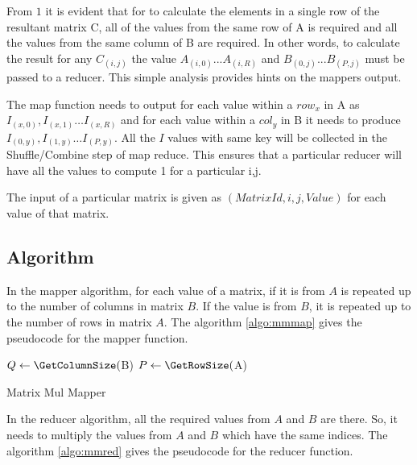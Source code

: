 \documentclass{article}
\begin{document}
From \(1\) it is evident that for to calculate the elements in a single row of the resultant matrix C, all of the values from the same row of A is required and all the values from the same column of B are required. In other words, to calculate the result for any ${C_{(i,j)}}$ the value ${A_{(i,0)} ... A_{(i,R)}}$ and ${B_{(0,j)} ... B_{(P,j)}}$ must be passed to a reducer. This simple analysis provides hints on the mapper\textsc{}s output.

The map function needs to output for each value within a ${row_{x}}$ in A as ${I_{(x, 0)}, I_{(x, 1)} …  I_{(x,R)}}$ and for each value within a ${col_{y}}$ in B it needs to produce ${I_{(0, y)}, I_{(1, y)} …  I_{(P,y)}}$. All the ${I}$ values with same key will be  collected in the Shuffle/Combine step of map reduce. This ensures that a particular reducer will have all the values to compute 1 for a particular i,j.

The input of a particular matrix is given as ${(MatrixId,i,j,Value)}$ for each value of that matrix.

\subsection{Algorithm}
In the mapper algorithm, for each value of a matrix, if it is from $A$ is repeated up to the number of columns in matrix $B$. If the value is from $B$, it is repeated up to the number of rows in matrix $A$. The algorithm \ref{algo:mmmap} gives the pseudocode for the mapper function.\BlankLine

\IncMargin{1em}
\begin{algorithm}[H]
\DontPrintSemicolon
{}
\BlankLine
$Q\leftarrow \GetColumnSize($B)\;
$P\leftarrow \GetRowSize($A)\;
\caption{Matrix Mul Mapper\label{algo:mmmap}}
\end{algorithm}
\DecMargin{1em}

\BlankLine In the reducer algorithm, all the required values from $A$ and $B$ are there. So, it needs to multiply the values from $A$ and $B$ which have the same indices. The algorithm \ref{algo:mmred} gives the pseudocode for the reducer function.\BlankLine
\end{document}
